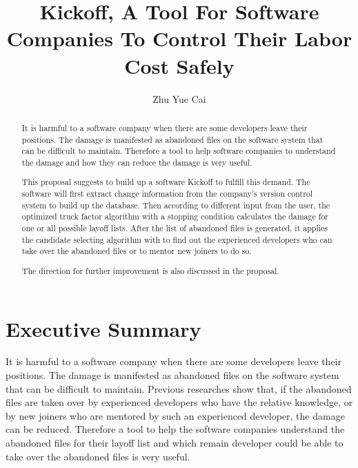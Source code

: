 \documentclass[12pt, a4paper, openright]{report}
\title{Kickoff, A Tool For Software Companies To Control Their Labor Cost Safely}
\author{Zhu Yue Cai}
\date{}
\begin{document}
\frontmatter


\begin{abstract}
	
It is harmful to a software company when there are some developers leave their positions. The damage is manifested as abandoned
files on the software system that can be difficult to maintain. Therefore a tool to help software companies to understand the damage and how they can reduce the damage is very useful.

This proposal suggests to build up a software Kickoff to fulfill this demand. The software will first extract change information from the company's version control system to build up the database. Then according to different input from the user, the optimized truck factor algorithm with a stopping condition calculates the damage for one or all possible layoff lists. After the list of abandoned files is generated, it applies the candidate selecting algorithm with to find out the experienced developers who can take over the abandoned files or to mentor new joiners to do so. 

The direction for further improvement is also discussed in the proposal. 

\end{abstract}


\maketitle
\tableofcontents %
\setcounter{page}{2} %
\chapter*{Executive Summary}
\setcounter{page}{3}
It is harmful to a software company when there are some developers leave their positions. The damage is manifested as abandoned
files on the software system that can be difficult to maintain. Previous researches show that, if the abandoned files are taken over by experienced developers who have the relative knowledge, or by new joiners who are mentored by such an experienced developer, the damage can be reduced. Therefore a tool to help the software companies understand the abandoned files for their layoff list and which remain developer could be able to take over the abandoned files is very useful.
\end{document}
